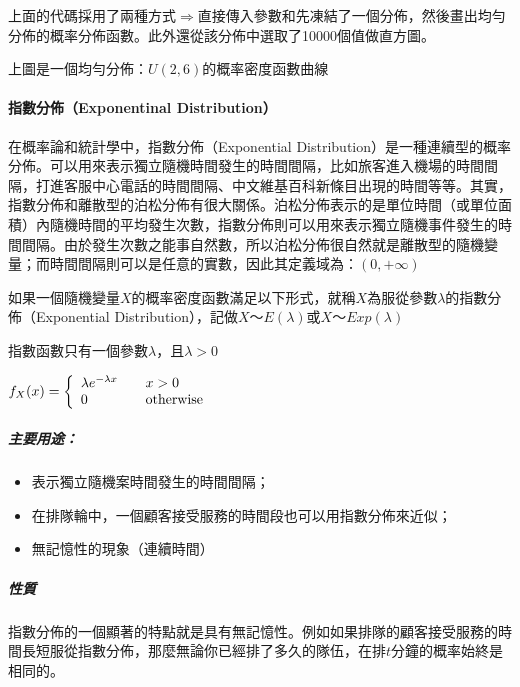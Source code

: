 \documentclass[11pt]{article}
\providecommand{\tightlist}{%
      \setlength{\itemsep}{0pt}\setlength{\parskip}{0pt}}
\begin{document}
上面的代碼採用了兩種方式\(\Rightarrow\)直接傳入參數和先凍結了一個分佈，然後畫出均勻分佈的概率分佈函數。此外還從該分佈中選取了10000個值做直方圖。

    上圖是一個均勻分佈：\(U(2,6)\)的概率密度函數曲線

    \hypertarget{ux6307ux6578ux5206ux4f48exponentinal-distribution}{%
\paragraph{指數分佈（Exponentinal
Distribution）}\label{ux6307ux6578ux5206ux4f48exponentinal-distribution}}

在概率論和統計學中，指數分佈（Exponential
Distribution）是一種連續型的概率分佈。可以用來表示獨立隨機時間發生的時間間隔，比如旅客進入機場的時間間隔，打進客服中心電話的時間間隔、中文維基百科新條目出現的時間等等。其實，指數分佈和離散型的泊松分佈有很大關係。泊松分佈表示的是單位時間（或單位面積）內隨機時間的平均發生次數，指數分佈則可以用來表示獨立隨機事件發生的時間間隔。由於發生次數之能事自然數，所以泊松分佈很自然就是離散型的隨機變量；而時間間隔則可以是任意的實數，因此其定義域為：\((0, +\infty)\)

    如果一個隨機變量\(X\)的概率密度函數滿足以下形式，就稱\(X\)為服從參數\(\lambda\)的指數分佈（Exponential
Distribution），記做\(X～E(\lambda)\)或\(X～Exp(\lambda)\)

指數函數只有一個參數\(\lambda\)，且\(\lambda > 0\)

\(\begin{equation} \nonumber f_X(x) = \left\{ \begin{array}{l l} \lambda e^{-\lambda x} & \quad x > 0\\ 0 & \quad \textrm{otherwise} \end{array} \right. \end{equation}\)

\hypertarget{ux4e3bux8981ux7528ux9014}{%
\subparagraph{主要用途：}\label{ux4e3bux8981ux7528ux9014}}

\begin{itemize}
\tightlist
\item
  表示獨立隨機案時間發生的時間間隔；
\item
  在排隊輪中，一個顧客接受服務的時間段也可以用指數分佈來近似；
\item
  無記憶性的現象（連續時間）
\end{itemize}

    \hypertarget{ux6027ux8cea}{%
\subparagraph{性質}\label{ux6027ux8cea}}

指數分佈的一個顯著的特點就是具有無記憶性。例如如果排隊的顧客接受服務的時間長短服從指數分佈，那麼無論你已經排了多久的隊伍，在排\(t\)分鐘的概率始終是相同的。
\end{document}

